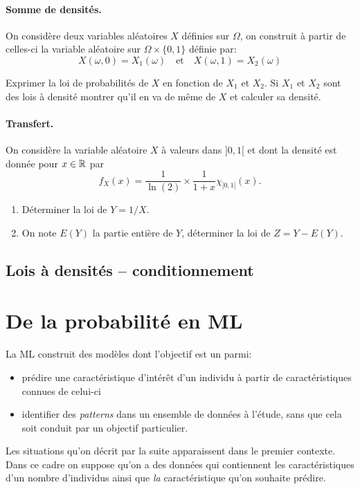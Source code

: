 \documentclass[11pt, a4paper]{article}
\begin{document}
\paragraph{Somme de densités.} On considère deux variables aléatoires
$X$ définies sur $\Omega$, on construit à partir de celles-ci la
variable aléatoire sur $\Omega \times \{0, 1\}$ définie par:
\[
X(\omega, 0) = X_1(\omega) \quad\textrm{et}\quad X(\omega, 1) = X_2(\omega)
\]
\begin{question}
  Exprimer la loi de probabilités de $X$ en fonction de $X_1$ et
  $X_2$. Si $X_1$ et $X_2$ sont des lois à densité montrer qu'il en va
  de même de $X$ et calculer sa densité.
\end{question}

\paragraph{Transfert.} On considère la variable aléatoire $X$ à valeurs
dans $]0, 1[$ et dont la densité est donnée pour $x \in \mathbb{R}$ par
\[
f_X(x) = \frac{1}{\ln(2)}\times \frac{1}{1+x}\chi_{]0, 1[}(x).
\]
\begin{question}
  \begin{enumerate}
  \item
    Déterminer la loi de $Y = 1/X$.
  \item
    On note $E(Y)$ la partie entière de $Y$, déterminer la loi de
    $Z = Y - E(Y)$.
  \end{enumerate}
\end{question}

\subsection{Lois à densités -- conditionnement}



\section{De la probabilité en ML}
\label{sec:ML}

\noindent La ML construit des modèles dont l'objectif est un parmi:
\begin{itemize}
\item[\textbullet] prédire une caractéristique d'intérêt d'un individu à partir de
  caractéristiques connues de celui-ci
\item[\textbullet] identifier des \emph{patterns} dans un ensemble de données à
  l'étude, sans que cela soit conduit par un objectif particulier.
\end{itemize}
Les situations qu'on décrit par la suite apparaissent dans le premier
contexte. Dans ce cadre on suppose qu'on a des données qui contiennent
les caractéristiques d'un nombre d'individus ainsi que \emph{la}
caractéristique qu'on souhaite prédire.
\end{document}
